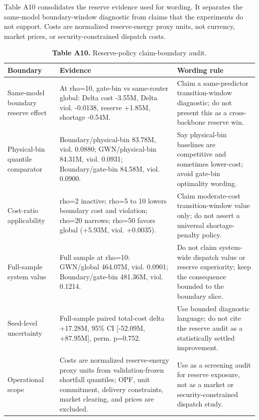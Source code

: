 \documentclass[
  11pt]{article}
\begin{document}
Table A10 consolidates the reserve evidence used for wording. It
separates the same-model boundary-window diagnostic from claims that the
experiments do not support. Costs are normalized reserve-energy proxy
units, not currency, market prices, or security-constrained dispatch
costs.

\begin{table}[H]
\centering
\scriptsize
\setlength{\tabcolsep}{2.2pt}
\renewcommand{\arraystretch}{1.08}
\caption*{\textbf{Table A10.} Reserve-policy claim-boundary audit.}
\begin{tabularx}{\columnwidth}{>{\raggedright\arraybackslash}p{} >{\raggedright\arraybackslash}p{} >{\raggedright\arraybackslash}X}
\toprule
Boundary & Evidence & Wording rule \\
\midrule
Same-model boundary reserve effect & At rho=10, gate-bin vs same-router global: Delta cost -3.55M, Delta viol. -0.0138, reserve +1.85M, shortage -0.54M. & Claim a same-predictor transition-window diagnostic; do not present this as a cross-backbone reserve win. \\
Physical-bin quantile comparator & Boundary/physical-bin 83.78M, viol. 0.0880; GWN/physical-bin 84.31M, viol. 0.0931; Boundary/gate-bin 84.58M, viol. 0.0900. & Say physical-bin baselines are competitive and sometimes lower-cost; avoid gate-bin optimality wording. \\
Cost-ratio applicability & rho=2 inactive; rho=5 to 10 lowers boundary cost and violation; rho=20 narrows; rho=50 favors global (+5.93M, viol. +0.0035). & Claim moderate-cost transition-window value only; do not assert a universal shortage-penalty policy. \\
Full-sample system value & Full sample at rho=10: GWN/global 464.07M, viol. 0.0901; Boundary/gate-bin 481.36M, viol. 0.1214. & Do not claim system-wide dispatch value or reserve superiority; keep the consequence bounded to the boundary slice. \\
Seed-level uncertainty & Full-sample paired total-cost delta +17.28M, 95\% CI [-52.09M, +87.95M], perm. p=0.752. & Use bounded diagnostic language; do not cite the reserve audit as a statistically settled improvement. \\
Operational scope & Costs are normalized reserve-energy proxy units from validation-frozen shortfall quantiles; OPF, unit commitment, delivery constraints, market clearing, and prices are excluded. & Use as a screening audit for reserve exposure, not as a market or security-constrained dispatch study. \\
\bottomrule
\end{tabularx}
\end{table}
\end{document}
